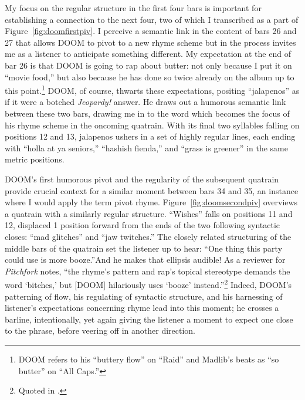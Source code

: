 My focus on the regular structure in the first four bars is important for establishing a connection
to the next four, two of which I transcribed as a part of Figure~\ref{fig:doomfirstpiv}. I perceive 
a semantic link in the content of bars 26 and 27 that allows DOOM to pivot to a new rhyme scheme but
in the process invites me as a listener to anticipate something different. My expectation at the end 
of  bar 26 is that DOOM is going to rap about butter: not only because I put it on ``movie food,'' 
but also because he has done so twice already on the album up to this point.\footnote{
    DOOM refers to his ``buttery flow'' on ``Raid'' and Madlib's beats as ``so butter'' on ``All 
    Caps.''}
DOOM, of course, thwarts these expectations, positing ``jalapenos'' as if it were a botched 
\textit{Jeopardy!} answer. He draws out a humorous semantic link between these two bars, drawing
me in to the word which becomes the focus of his rhyme scheme in the oncoming quatrain. With its
final two syllables falling on positions 12 and 13, jalapenos ushers in a set of highly regular
lines, each ending with ``holla at ya seniors,'' ``hashish fienda,'' and ``grass is greener''
in the same metric positions.

DOOM's first humorous pivot and the regularity of the subsequent quatrain provide crucial context
for a similar moment between bars 34 and 35, an instance where I would apply the term pivot rhyme.
Figure~\ref{fig:doomsecondpiv} overviews a quatrain with a similarly regular structure. ``Wishes'' 
falls on positions 11 and 12, displaced 1 position forward from the ends of the two following 
syntactic  closes: ``mad glitches'' and ``jaw twitches.'' The closely related structuring of the 
middle bars of the quatrain set the listener up to hear: ``One thing this party could use is more\textellipsis
booze.''And he makes that ellipsis audible! As a reviewer for \textit{Pitchfork} notes, ``the rhyme's 
pattern and rap's topical stereotype demands the word `bitches,' but [DOOM] hilariously uses `booze'
instead.''\footnote{
    Quoted in \cite{estellecaswellRappingDeconstructedBest2016}.}
Indeed, DOOM's patterning of flow, his regulating of syntactic structure, and his harnessing of
listener's expectations concerning rhyme lead into this moment; he crosses a barline, intentionally,
yet again giving the listener a moment to expect one close to the phrase, before veering off in 
another direction.

